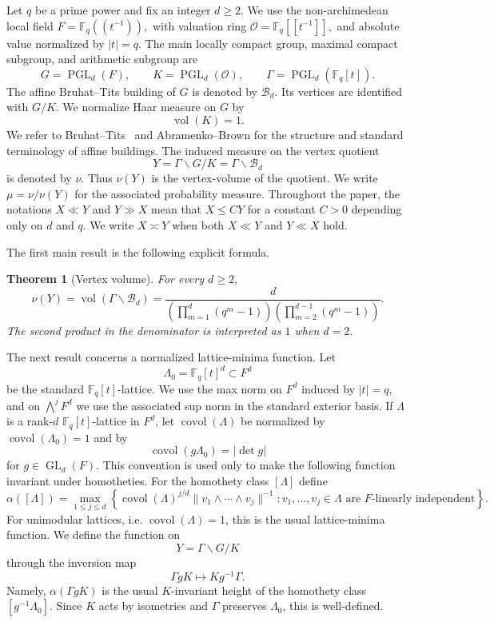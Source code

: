 \documentclass[11pt]{amsart}
\newcommand{\Fq}{\mathbb F_q}
\newcommand{\OO}{\mathcal O}
\newcommand{\GL}{\operatorname{GL}}
\newcommand{\PGL}{\operatorname{PGL}}
\newcommand{\vol}{\operatorname{vol}}
\newcommand{\covol}{\operatorname{covol}}
\theoremstyle{plain}
\newtheorem{theorem}{Theorem}[section]
\theoremstyle{definition}
\numberwithin{equation}{section}
\begin{document}
Let $q$ be a prime power and fix an integer $d\ge2$.  We use the non-archimedean local
field
\(
  F=\Fq(\!(t^{-1})\!),
\)
with valuation ring
\(
  \OO=\Fq[\![t^{-1}]\!],
\)
and absolute value normalized by $|t|=q$.  The main locally compact group, maximal compact
subgroup, and arithmetic subgroup are
\[
  G=\PGL_d(F),\qquad K=\PGL_d(\OO),\qquad \Gamma=\PGL_d(\Fq[t]).
\]
The affine Bruhat--Tits building of $G$ is denoted by $\mathcal B_d$.  Its vertices are
identified with $G/K$.  We normalize Haar measure on $G$ by
\[
  \vol(K)=1.
\]
We refer to Bruhat--Tits~\cite{BruhatTits} and Abramenko--Brown
\cite{AbramenkoBrown} for the structure and standard terminology of affine buildings.
The induced measure on the vertex quotient
\[
  Y=\Gamma\backslash G/K=\Gamma\backslash\mathcal B_d
\]
is denoted by $\nu$.  Thus $\nu(Y)$ is the vertex-volume of the quotient.  We write
$\mu=\nu/\nu(Y)$ for the associated probability measure.  Throughout the paper, the
notations $X\ll Y$ and $Y\gg X$ mean that $X\le CY$ for a constant $C>0$ depending
only on $d$ and $q$.  We write $X\asymp Y$ when both $X\ll Y$ and $Y\ll X$ hold.

The first main result is the following explicit formula.

\begin{theorem}[Vertex volume]\label{thm:volume}
For every $d\ge2$,
\[
  \nu(Y)=\vol(\Gamma\backslash \mathcal B_d)
  =
  \frac{d}{\left(\prod_{m=1}^{d}(q^m-1)\right)
            \left(\prod_{m=2}^{d-1}(q^m-1)\right)}.
\]
The second product in the denominator is interpreted as $1$ when $d=2$.
\end{theorem}

The next result concerns a normalized lattice-minima function.  Let
\[
  \Lambda_0=\Fq[t]^d\subset F^d
\]
be the standard $\Fq[t]$-lattice.  We use the max norm on $F^d$ induced by $|t|=q$, and
on $\bigwedge^jF^d$ we use the associated sup norm in the standard exterior basis.  If
$\Lambda$ is a rank-$d$ $\Fq[t]$-lattice in $F^d$, let $\covol(\Lambda)$ be normalized by
$\covol(\Lambda_0)=1$ and by
\[
  \covol(g\Lambda_0)=|\det g|
\]
for $g\in\GL_d(F)$.  This convention is used only to make the following function invariant
under homotheties.  For the homothety class $[\Lambda]$ define
\begin{equation}\label{eq:alpha-def-intro}
  \alpha([\Lambda])
  =\max_{1\le j\le d}
    \left\{
    \covol(\Lambda)^{j/d}
    \|v_1\wedge\cdots\wedge v_j\|^{-1}:
    v_1,\ldots,v_j\in\Lambda \text{ are $F$-linearly independent}
    \right\}.
\end{equation}
For unimodular lattices, i.e. $\covol(\Lambda)=1$, this is the usual lattice-minima
function.  We define the function on
\[
  Y=\Gamma\backslash G/K
\]
through the inversion map
\[
  \Gamma gK\longmapsto Kg^{-1}\Gamma.
\]
Namely, $\alpha(\Gamma gK)$ is the usual $K$-invariant height of the homothety class
$[g^{-1}\Lambda_0]$.  Since $K$ acts by isometries and $\Gamma$ preserves
$\Lambda_0$, this is well-defined.
\end{document}

